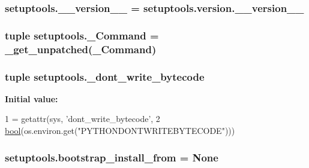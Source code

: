 \subsubsection[{\+\_\+\+\_\+version\+\_\+\+\_\+}]{\setlength{\rightskip}{0pt plus 5cm}setuptools.\+\_\+\+\_\+version\+\_\+\+\_\+ = setuptools.\+version.\+\_\+\+\_\+version\+\_\+\+\_\+}\label{namespacesetuptools_a032cd4f48c18d83d8bb090942751a9cc}
\hypertarget{namespacesetuptools_ae44b3e3d5d0f189812f3afdf135c6514}{}
\subsubsection[{\+\_\+\+Command}]{\setlength{\rightskip}{0pt plus 5cm}tuple setuptools.\+\_\+\+Command = \+\_\+get\+\_\+unpatched(\+\_\+\+Command)}\label{namespacesetuptools_ae44b3e3d5d0f189812f3afdf135c6514}
\hypertarget{namespacesetuptools_a0c8f1da9f49e958e95cadcd6a44b51c7}{}
\subsubsection[{\+\_\+dont\+\_\+write\+\_\+bytecode}]{\setlength{\rightskip}{0pt plus 5cm}tuple setuptools.\+\_\+dont\+\_\+write\+\_\+bytecode}\label{namespacesetuptools_a0c8f1da9f49e958e95cadcd6a44b51c7}
{\bfseries Initial value\+:}
\begin{DoxyCode}
1 = getattr(sys, \textcolor{stringliteral}{'dont\_write\_bytecode'},
2     \hyperlink{compiler_8h_abb452686968e48b67397da5f97445f5b}{bool}(os.environ.get(\textcolor{stringliteral}{"PYTHONDONTWRITEBYTECODE"})))
\end{DoxyCode}
\hypertarget{namespacesetuptools_a7d51d85e64a02e0808685340753eec38}{}
\subsubsection[{bootstrap\+\_\+install\+\_\+from}]{\setlength{\rightskip}{0pt plus 5cm}setuptools.\+bootstrap\+\_\+install\+\_\+from = None}\label{namespacesetuptools_a7d51d85e64a02e0808685340753eec38}
\hypertarget{namespacesetuptools_af3f752d8ed43dd0bf1640292cf7f2540}{}
